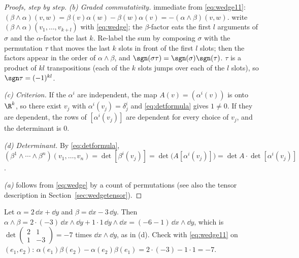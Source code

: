 \begin{proof}[Proofs, step by step]
\emph{(b) Graded commutativity.}  immediate from \eqref{eq:wedge11}:
$(\beta\wedge\alpha)(v,w)=\beta(v)\alpha(w)-\beta(w)\alpha(v)=-(\alpha\wedge\beta)(v,w)$.
 write $(\beta\wedge\alpha)(v_1,\dots,v_{k+l})$ with \eqref{eq:wedge}; the $\beta$-factor eats the first $l$
arguments of $\sigma$ and the $\alpha$-factor the last $k$. Re-label the sum by composing $\sigma$ with the permutation $\tau$ that
moves the last $k$ slots in front of the first $l$ slots; then the factors appear in the order of $\alpha\wedge\beta$, and
$\sgn(\sigma\tau)=\sgn(\sigma)\sgn(\tau)$.  $\tau$ is a product of $kl$ transpositions (each of the $k$ slots jumps
over each of the $l$ slots), so $\sgn\tau=(-1)^{kl}$.

\emph{(c) Criterion.} If the $\alpha^i$ are independent, the map $A(v)=(\alpha^i(v))$ is onto $\R^k$, so there exist $v_j$ with
$\alpha^i(v_j)=\delta^i_j$ and \eqref{eq:detformula} gives $1\neq0$. If they are dependent, the rows of $[\alpha^i(v_j)]$ are dependent
for every choice of $v_j$, and the determinant is $0$.

\emph{(d) Determinant.} By \eqref{eq:detformula}, $(\beta^1\wedge\cdots\wedge\beta^n)(v_1,\dots,v_n)=\det[\beta^i(v_j)]=\det\bigl(A[\alpha^i(v_j)]\bigr)=\det A\cdot\det[\alpha^i(v_j)]$.

\emph{(a)} follows from \eqref{eq:wedge} by a count of permutations (see also the tensor description in
Section~\ref{sec:wedgetensor}).
\end{proof}


\begin{example}\label{ex:wedge2}
Let $\alpha=2\,\dd x+\dd y$ and $\beta=\dd x-3\,\dd y$. Then $\alpha\wedge\beta=2\cdot(-3)\,\dd x\wedge\dd y+1\cdot1\,\dd y\wedge\dd x
=(-6-1)\,\dd x\wedge\dd y$, which is $\det\begin{pmatrix}2&1\\1&-3\end{pmatrix}=-7$ times $\dd x\wedge\dd y$, as in (d). Check with
\eqref{eq:wedge11} on $(e_1,e_2)$: $\alpha(e_1)\beta(e_2)-\alpha(e_2)\beta(e_1)=2\cdot(-3)-1\cdot1=-7$.
\end{example}
